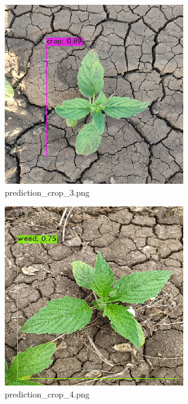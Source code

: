 \documentclass[12pt]{exam}
\begin{document}
\begin{questions}
\begin{parts}
		\hfill

		\begin{figure}[H]
			\includegraphics[width=\textwidth]{images-yolo/prediction_crop_3.png}
			\caption{prediction\_crop\_3.png}
		\end{figure}

		\hfill

		\begin{figure}[H]
			\includegraphics[width=\textwidth]{images-yolo/prediction_crop_4.png}
			\caption{prediction\_crop\_4.png}
		\end{figure}


\end{parts}
\end{questions}
\end{document}
